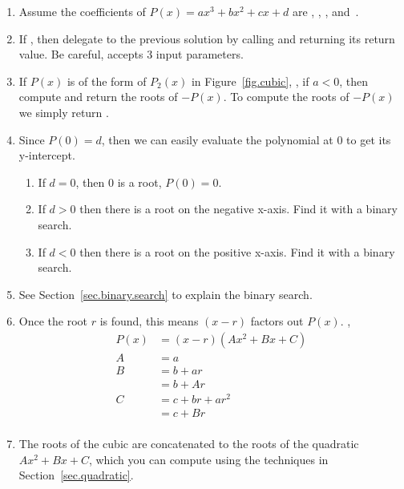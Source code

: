 \begin{enumerate}
\item Assume the coefficients of $P(x) = a x^3 + b x^2 + c x + d$ are
  ,  ,  ,  and~.
\item If , then delegate to the previous solution by
  calling  and returning its return
  value.  Be careful,  accepts 3 input
  parameters.
\item If $P(x)$ is of the form of $P_2(x)$ in Figure~\ref{fig.cubic},
  \ie, if $a<0$, then compute and return the roots of $-P(x)$.  To
  compute the roots of $-P(x)$ we simply return
  .
\item Since $P(0) = d$, then we can easily evaluate the polynomial at 0 to get its y-intercept.
  \begin{enumerate}
  \item If $d = 0$, then 0 is a root, $P(0) = 0$.
  \item If $d>0$ then there is a root on the negative x-axis.  Find it with a binary search.
  \item If $d<0$ then there is a root on the positive x-axis. Find it with a binary search.
  \end{enumerate}
\item See Section~\ref{sec.binary.search} to explain the binary search.
\item Once the root $r$ is found, this means $(x-r)$ factors out $P(x)$. \Ie,
  \begin{align*}
    P(x) &= (x-r)(A x^2 + B x + C)\\ 
    A &= a\\
    B &= b + a r \\
    &= b + A r\\
    C &= c + b r + a r^2 \\
    &=
    c + B r\\
  \end{align*}
\item The roots of the cubic are \code{[r]} concatenated to the roots of the quadratic 
  $A x^2 + B x + C$, which you can compute using the techniques in Section~\ref{sec.quadratic}.
\end{enumerate}

